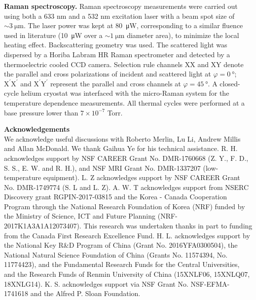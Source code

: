 \documentclass[prl, preprint, superscriptaddress]{revtex4-1}
\begin{document}
\noindent \textbf{Raman spectroscopy.} Raman spectroscopy measurements were carried out using both a 633 nm and a 532 nm excitation laser with a beam spot size of $\sim\SI{3}{\micro\meter}$. The laser power was kept at \SI{80}{\micro\watt}, corresponding to a similar fluence used in literature (\SI{10}{\micro\watt} over a $\sim\SI{1}{\micro\meter}$ diameter area), to minimize the local heating effect. Backscattering geometry was used. The scattered light was dispersed by a Horiba Labram HR Raman spectrometer and detected by a thermoelectric cooled CCD camera. Selection rule channels XX and XY denote the parallel and cross polarizations of incident and scattered light at $\varphi=\SI{0}{\degree}$; $\mathrm{X^{\prime}X^{\prime}}$ and $\mathrm{X^{\prime}Y^{\prime}}$ represent the parallel and cross channels at $\varphi=\SI{45}{\degree}$. A closed-cycle helium cryostat was interfaced with the micro-Raman system for the temperature dependence measurements. All thermal cycles were performed at a base pressure lower than $7\times10^{-7}$ Torr. \\



\nocite{apsrev41Control}
 

\newpage
\noindent\textbf{Acknowledgements} \\
\noindent We acknowledge useful discussions with Roberto Merlin, Lu Li, Andrew Millis and Allan McDonald. We thank Gaihua Ye for his technical assistance. R. H. acknowledges support by NSF CAREER Grant No. DMR-1760668 (Z. Y., F. D., S. S., E. W. and R. H.), and NSF MRI Grant No. DMR-1337207 (low-temperature equipment). L. Z acknowledges support by NSF CAREER Grant No. DMR-1749774 (S. L and L. Z). A. W. T acknowledges support from NSERC Discovery grant RGPIN-2017-03815 and the Korea - Canada Cooperation Program through the National Research Foundation of Korea (NRF) funded by the Ministry of Science, ICT and Future Planning (NRF-2017K1A3A1A12073407). This research was undertaken thanks in part to funding from the Canada First Research Excellence Fund. H. L. acknowledges support by the National Key R\&D Program of China (Grant No. 2016YFA0300504), the National Natural Science Foundation of China (Grants No. 11574394, No. 11774423), and the Fundamental Research Funds for the Central Universities, and the Research Funds of Renmin University of China (15XNLF06, 15XNLQ07, 18XNLG14). K. S. acknowledges support via NSF Grant No. NSF-EFMA-1741618 and the Alfred P. Sloan Foundation.\\
\end{document}
